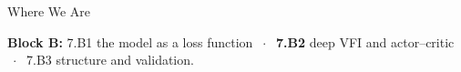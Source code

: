 

\graphicspath{{./figures/}}




\makedecktitle

\begin{frame}{Where We Are}
\vspace{-1mm}
\begin{center}
\small \textbf{Block B:} 7.B1 the model as a loss function $\;\cdot\;$ \textbf{7.B2} deep VFI and actor--critic $\;\cdot\;$ 7.B3 structure and validation.
\end{center}
\end{frame}

